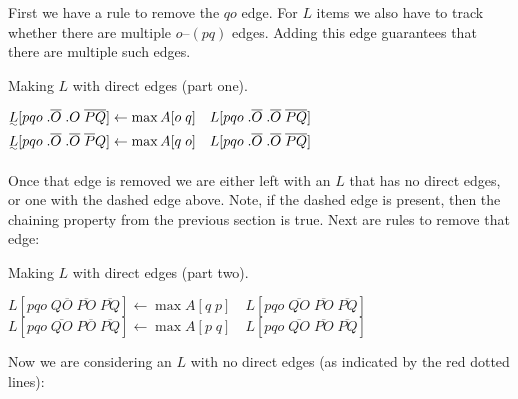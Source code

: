 First we have a rule to remove the $qo$ edge.
For $L$ items we also have to track whether there are multiple $o$--$(pq)$ edges.
Adding this edge guarantees that there are multiple such edges.

\begin{finalEquation}
\caption{Making $L$ with direct edges (part one).}
  $\uwave{L}[pqo \; .\overline{O} \; .O \; \overline{PQ}] \leftarrow \max A[o \; q] \quad L[pqo \; .\overline{O} \; .\overline{O} \; \overline{PQ}]$ \\
  $\uwave{L}[pqo \; .\overline{O} \; .\overline{O} \; \overline{P}Q] \leftarrow \max A[q \; o] \quad L[pqo \; .\overline{O} \; .\overline{O} \; \overline{PQ}]$
\end{finalEquation}

Once that edge is removed we are either left with an $L$ that has no direct edges, or one with the dashed edge above.
Note, if the dashed edge is present, then the chaining property from the previous section is true.
Next are rules to remove that edge:

\begin{finalEquation}
\caption{Making $L$ with direct edges (part two).}
  $L[pqo \; Q\overline{O} \; \overline{PO} \; \overline{PQ}] \leftarrow \max A[q \; p] \quad L[pqo \; \overline{QO} \; \overline{PO} \; \overline{PQ}]$ \\
  $L[pqo \; \overline{QO} \; P\overline{O} \; \overline{PQ}] \leftarrow \max A[p \; q] \quad L[pqo \; \overline{QO} \; \overline{PO} \; \overline{PQ}]$
\end{finalEquation}

Now we are considering an $L$ with no direct edges (as indicated by the red dotted lines):

\begin{center}
\end{center}

